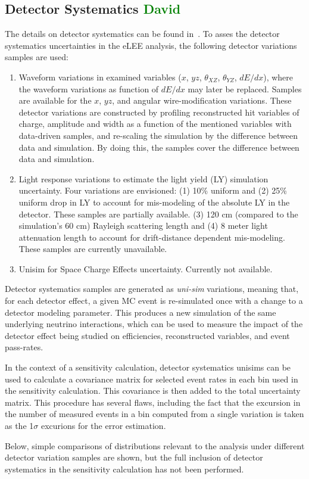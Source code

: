 \documentclass[a4paper]{article}
\begin{document}
\subsection{Detector Systematics \textcolor{green}{David}}
The details on detector systematics can be found in~\cite{bib:detsyssupportnote}. To asses the detector systematics uncertainties in the eLEE analysis, the following detector variations samples are used:
\begin{enumerate}
    \item Waveform variations in examined variables ($x$, $yz$, $\theta_{XZ}$, $\theta_{YZ}$, $dE/dx$), where the waveform variations as function of $dE/dx$ may later be replaced. Samples are available for the $x$, $yz$, and angular wire-modification variations. These detector variations are constructed by profiling reconstructed hit variables of charge, amplitude and width as a function of the mentioned variables with data-driven samples, and re-scaling the simulation by the difference between data and simulation. By doing this, the samples cover the difference between data and simulation. 
    \item Light response variations to estimate the light yield (LY) simulation uncertainty. Four variations are envisioned: (1) 10\% uniform and (2) 25\% uniform drop in LY to account for mis-modeling of the absolute LY in the detector. These samples are partially available. (3) 120 cm (compared to the simulation's 60 cm) Rayleigh scattering length and (4) 8 meter light attenuation length to account for drift-distance dependent mis-modeling. These samples are currently unavailable.
    \item Unisim for Space Charge Effects uncertainty. Currently not available.
\end{enumerate}
\par Detector systematics samples are generated as \emph{uni-sim} variations, meaning that, for each detector effect, a given MC event is re-simulated once with a change to a detector modeling parameter. This produces a new simulation of the same underlying neutrino interactions, which can be used to measure the impact of the detector effect being studied on efficiencies, reconstructed variables, and event pass-rates.
\par In the context of a sensitivity calculation, detector systematics unisims can be used to calculate a covariance matrix for selected event rates in each bin used in the sensitivity calculation. This covariance is then added to the total uncertainty matrix. This procedure has several flaws, including the fact that the excursion in the number of measured events in a bin computed from a single variation is taken as the 1$\sigma$ excurions for the error estimation. 
\par Below, simple comparisons of distributions relevant to the analysis under different detector variation samples are shown, but the full inclusion of detector systematics in the sensitivity calculation has not been performed.
\end{document}
